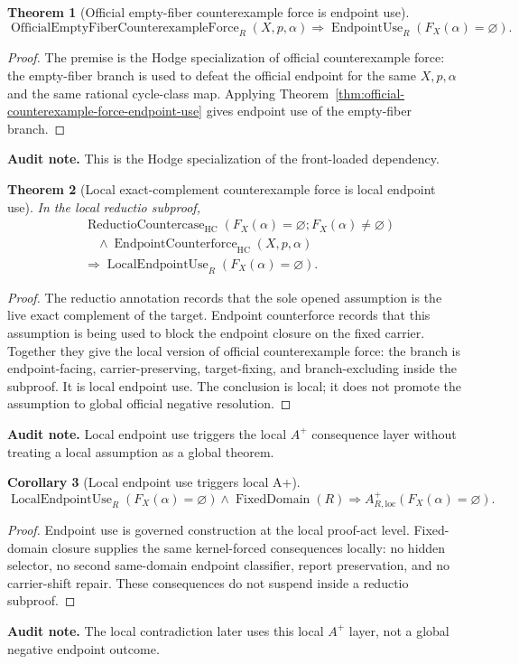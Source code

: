 \documentclass[11pt]{article}
\newtheorem{theorem}{Theorem}[section]
\newtheorem{corollary}[theorem]{Corollary}
\newcommand{\HC}{\operatorname{HC}}
\newcommand{\EndpointUse}{\operatorname{EndpointUse}}
\newcommand{\FixedDomain}{\operatorname{FixedDomain}}
\begin{document}
\begin{theorem}[Official empty-fiber counterexample force is endpoint use]
\[
\operatorname{OfficialEmptyFiberCounterexampleForce}_R(X,p,\alpha)
\Rightarrow \EndpointUse_R(F_X(\alpha)=\varnothing).
\]
\end{theorem}
\begin{proof}
The premise is the Hodge specialization of official counterexample force: the empty-fiber branch is used to defeat the official endpoint for the same $X,p,\alpha$ and the same rational cycle-class map.  Applying Theorem~\ref{thm:official-counterexample-force-endpoint-use} gives endpoint use of the empty-fiber branch.
\end{proof}
\par\noindent\textbf{Audit note.} This is the Hodge specialization of the front-loaded dependency.

\begin{theorem}[Local exact-complement counterexample force is local endpoint use]
In the local reductio subproof,
\[
\begin{aligned}
&\operatorname{ReductioCountercase}_{\HC}(F_X(\alpha)=\varnothing;
  F_X(\alpha)\neq\varnothing)\\
&\quad{}\wedge \operatorname{EndpointCounterforce}_{\HC}(X,p,\alpha)\\
&\Rightarrow \operatorname{LocalEndpointUse}_R(F_X(\alpha)=\varnothing).
\end{aligned}
\]
\end{theorem}
\begin{proof}
The reductio annotation records that the sole opened assumption is the live exact complement of the target.  Endpoint counterforce records that this assumption is being used to block the endpoint closure on the fixed carrier.  Together they give the local version of official counterexample force: the branch is endpoint-facing, carrier-preserving, target-fixing, and branch-excluding inside the subproof.  It is local endpoint use.  The conclusion is local; it does not promote the assumption to global official negative resolution.
\end{proof}
\par\noindent\textbf{Audit note.} Local endpoint use triggers the local $A^+$ consequence layer without treating a local assumption as a global theorem.

\begin{corollary}[Local endpoint use triggers local A+]
\[
\operatorname{LocalEndpointUse}_R(F_X(\alpha)=\varnothing)\wedge \FixedDomain(R)
\Rightarrow A^+_{R,\mathrm{loc}}(F_X(\alpha)=\varnothing).
\]
\end{corollary}
\begin{proof}
Endpoint use is governed construction at the local proof-act level.  Fixed-domain closure supplies the same kernel-forced consequences locally: no hidden selector, no second same-domain endpoint classifier, report preservation, and no carrier-shift repair.  These consequences do not suspend inside a reductio subproof.
\end{proof}
\par\noindent\textbf{Audit note.} The local contradiction later uses this local $A^+$ layer, not a global negative endpoint outcome.
\end{document}
